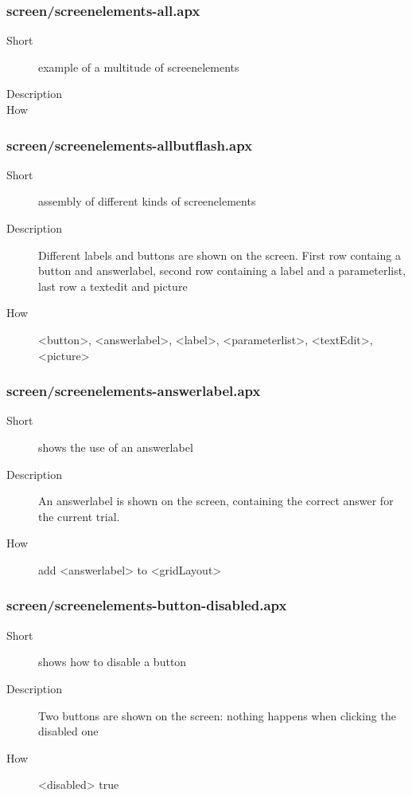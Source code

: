 \subsubsection{screen/screenelements-all.apx}
\begin{description}
\item[Short] 
 example of a multitude of screenelements
\item[Description] 

\item[How] 

\end{description}

\subsubsection{screen/screenelements-allbutflash.apx}
\begin{description}
\item[Short] 
 assembly of different kinds of screenelements
\item[Description] 
 Different labels and buttons are shown on the screen. First row containg a button and answerlabel, second row containing a label and a parameterlist, last row a textedit and picture
\item[How] 
 \textless{}button\textgreater{}, \textless{}answerlabel\textgreater{}, \textless{}label\textgreater{}, \textless{}parameterlist\textgreater{}, \textless{}textEdit\textgreater{}, \textless{}picture\textgreater{}
\end{description}

\subsubsection{screen/screenelements-answerlabel.apx}
\begin{description}
\item[Short] 
 shows the use of an answerlabel
\item[Description] 
 An answerlabel is shown on the screen, containing the correct answer for the current trial.
\item[How] 
 add \textless{}answerlabel\textgreater{} to \textless{}gridLayout\textgreater{}
\end{description}

\subsubsection{screen/screenelements-button-disabled.apx}
\begin{description}
\item[Short] 
 shows how to disable a button
\item[Description] 
 Two buttons are shown on the screen: nothing happens when clicking the disabled one
\item[How] 
 \textless{}disabled\textgreater{} true
\end{description}

